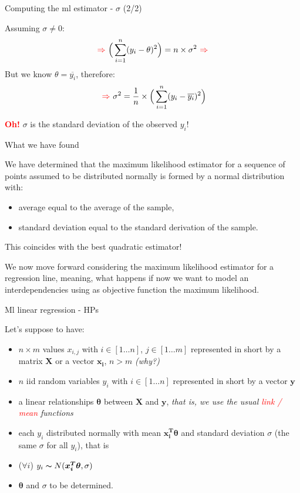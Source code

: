 \documentclass{beamer}
\begin{document}
\begin{frame}
{\centerline{Computing the ml estimator - $\sigma$ (2/2)}}

Assuming $\sigma \ne 0$: 
$$ 
~\textcolor{red}{\Rightarrow}~
 \Big(\sum_{i=1}^n  ({y_i - \theta})^2 \Big) = n \times \sigma^2 
 ~\textcolor{red}{\Rightarrow}~
$$
But we know $\theta = \overline{y_i}$, therefore:
$$
~\textcolor{red}{\Rightarrow}~
 \sigma^2 = {\frac 1 n} \times \Big(\sum_{i=1}^n  ({y_i - \overline{y_i}})^2 \Big) 
 $$
 
\textcolor{red}{\bf Oh!} $\sigma$ is the standard deviation of the observed $y_i$!

\end{frame}

\begin{frame}
{\centerline{What we have found}}

We have determined that the maximum likelihood estimator for a sequence of points assumed to be distributed normally is formed by a normal distribution with:
\begin{itemize}
\item average equal to the average of the sample,
\item standard deviation equal to the standard derivation of the sample.
\end{itemize}

This coincides with the best quadratic estimator!
\vspace{1cm}

We now move forward considering the maximum likelihood estimator for a regression line, meaning, what happens if now we want to model an interdependencies using as objective function the maximum likelihood.

\end{frame}

\begin{frame}
{\centerline{Ml linear regression - HPs}}

Let's suppose to have:
\begin{itemize}
\item $n \times m$ values $x_{i,j}$ with $ i \in [1 \ldots n]$, $ j \in [1 \ldots m]$ represented in short by a matrix $\boldsymbol{X}$ or a vector $\mathbf{x_i}$, $n>m$ \textit{(why?)}
\item $n$ iid random variables $y_i$ with $ i \in [1 \ldots n]$ represented in short by a vector $\boldsymbol{y}$
\item a linear relationships $\boldsymbol{\theta}$ between $\boldsymbol{X}$  and $\boldsymbol{y}$, \textit{that is, we use the usual \textcolor{red}{link / mean} functions}
\item each $y_i$ distributed normally with mean $\boldsymbol{x_i^T \theta}$ and standard deviation $\sigma$ (the same $\sigma$ for all $y_i$), that is 
\item ($\forall i$) $y_i \thicksim N(\boldsymbol{x_i^T \theta},\sigma)$
\item $\boldsymbol{\theta}$ and $\sigma$ to be determined.
\end{itemize}
\end{frame}
\end{document}
